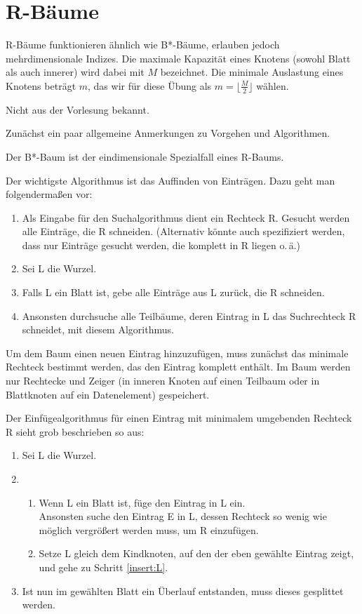 \section{R-Bäume}
R-Bäume funktionieren ähnlich wie B*-Bäume, erlauben jedoch mehrdimensionale Indizes.
Die maximale Kapazität eines Knotens (sowohl Blatt als auch innerer) wird dabei mit $M$ bezeichnet.
Die minimale Auslastung eines Knotens beträgt $m$, das wir für diese Übung als $m = \lfloor\frac{M}{2}\rfloor$ wählen.

\begin{note}
	Nicht aus der Vorlesung bekannt.
\end{note}

\begin{solution}
	Zunächst ein paar allgemeine Anmerkungen zu Vorgehen und Algorithmen.

	Der B*-Baum ist der eindimensionale Spezialfall eines R-Baums.

	Der wichtigste Algorithmus ist das Auffinden von Einträgen.
	Dazu geht man folgendermaßen vor:
	\begin{enumerate}
		\item Als Eingabe für den Suchalgorithmus dient ein Rechteck R.
		Gesucht werden alle Einträge, die R schneiden.
		(Alternativ könnte auch spezifiziert werden, dass nur Einträge gesucht werden, die komplett in R liegen o.\,ä.)
		\item Sei L die Wurzel.
		\item Falls L ein Blatt ist, gebe alle Einträge aus L zurück, die R schneiden.
		\item Ansonsten durchsuche alle Teilbäume, deren Eintrag in L das Suchrechteck R schneidet, mit diesem Algorithmus.
	\end{enumerate}

	Um dem Baum einen neuen Eintrag hinzuzufügen, muss zunächst das minimale Rechteck bestimmt werden, das den Eintrag komplett enthält.
	Im Baum werden nur Rechtecke und Zeiger (in inneren Knoten auf einen Teilbaum oder in Blattknoten auf ein Datenelement) gespeichert.

	Der Einfügealgorithmus für einen Eintrag mit minimalem umgebenden Rechteck R sieht grob beschrieben so aus:
	\begin{enumerate}
		\item Sei L die Wurzel.
		\item 
		\begin{enumerate}
			\item \label{insert:L}Wenn L ein Blatt ist, füge den Eintrag in L ein. \\
			Ansonsten suche den Eintrag E in L, dessen Rechteck so wenig wie möglich vergrößert werden muss, um R einzufügen.
			\item Setze L gleich dem Kindknoten, auf den der eben gewählte Eintrag zeigt, und gehe zu Schritt \ref{insert:L}.
		\end{enumerate}
		\item Ist nun im gewählten Blatt ein Überlauf entstanden, muss dieses gesplittet werden.
	\end{enumerate}


\end{solution}
